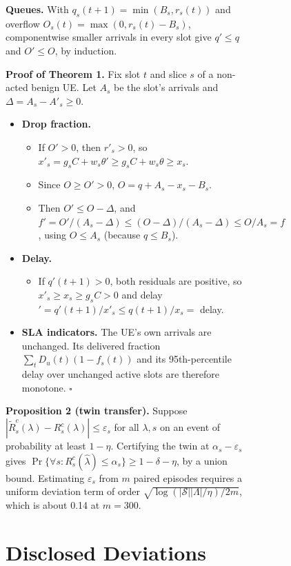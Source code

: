 \begin{figure}[!t]
{\begin{figure}[!t]
{\textbf{Queues.} With \(q_s(t+1)=\min(B_s,r_s(t))\) and overflow
\(O_s(t)=\max(0,r_s(t)-B_s)\), componentwise smaller arrivals in every
slot give \(q'\le q\) and \(O'\le O\), by induction.

\textbf{Proof of Theorem 1.} Fix slot \(t\) and slice \(s\) of a
non-acted benign UE. Let \(A_s\) be the slot's arrivals and
\(\Delta=A_s-A'_s\ge0\).

\begin{itemize}
\tightlist
\item
  \textbf{Drop fraction.}

  \begin{itemize}
  \tightlist
  \item
    If \(O'>0\), then \(r'_s>0\), so
    \(x'_s=g_sC+w_s\theta'\ge g_sC+w_s\theta\ge x_s\).
  \item
    Since \(O\ge O'>0\), \(O=q+A_s-x_s-B_s\).
  \item
    Then \(O'\le O-\Delta\), and
    \(f'=O'/(A_s-\Delta)\le(O-\Delta)/(A_s-\Delta)\le O/A_s=f\), using
    \(O\le A_s\) (because \(q\le B_s\)).
  \end{itemize}
\item
  \textbf{Delay.}

  \begin{itemize}
  \tightlist
  \item
    If \(q'(t+1)>0\), both residuals are positive, so
    \(x'_s\ge x_s\ge g_sC>0\) and delay\('=q'(t+1)/x'_s\le q(t+1)/x_s=\)
    delay.
  \end{itemize}
\item
  \textbf{SLA indicators.} The UE's own arrivals are unchanged. Its
  delivered fraction \(\sum_tD_u(t)(1-f_s(t))\) and its 95th-percentile
  delay over unchanged active slots are therefore monotone. $\square$
\end{itemize}

\textbf{Proposition 2 (twin transfer).} Suppose
\(|\tilde{R}^c_s(\lambda)-R^c_s(\lambda)|\le\varepsilon_s\) for all
\(\lambda,s\) on an event of probability at least \(1-\eta\). Certifying
the twin at \(\alpha_s-\varepsilon_s\) gives
\(\Pr\{\forall s:R^c_s(\hat{\lambda})\le\alpha_s\}\ge1-\delta-\eta\), by
a union bound. Estimating \(\varepsilon_s\) from \(m\) paired episodes
requires a uniform deviation term of order
\(\sqrt{\log(|\mathcal{S}||\Lambda|/\eta)/2m}\), which is about 0.14 at
\(m=300\).

\hypertarget{app:deviations}{%
\section{Disclosed Deviations}\label{app:deviations}}

}
\end{figure}}
\end{figure}
